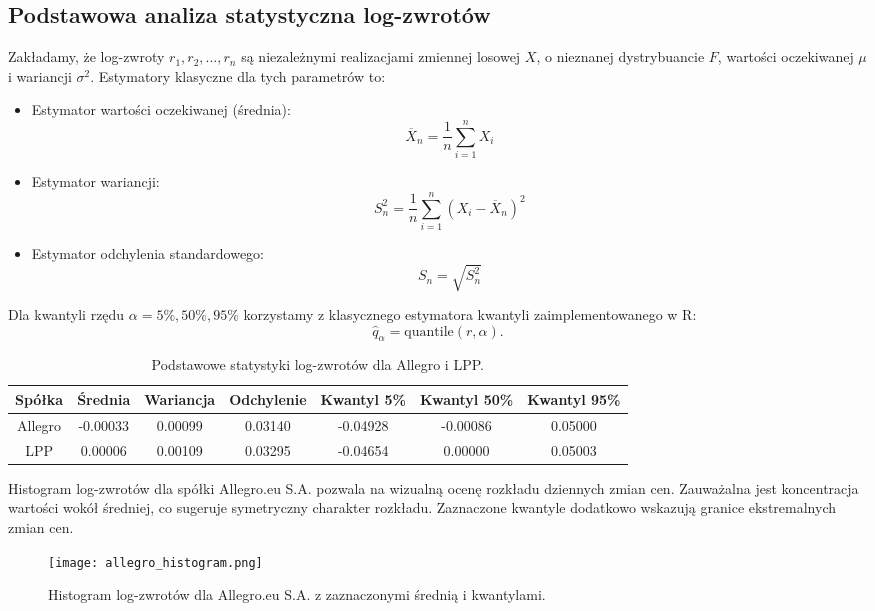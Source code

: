 \documentclass[12pt]{article}
\begin{document}
\subsection{Podstawowa analiza statystyczna log-zwrotów}

Zakładamy, że log-zwroty \( r_1, r_2, \ldots, r_n \) są niezależnymi realizacjami zmiennej losowej \( X \), o nieznanej dystrybuancie \( F \), wartości oczekiwanej \( \mu \) i wariancji \( \sigma^2 \). Estymatory klasyczne dla tych parametrów to:
\begin{itemize}
    \item Estymator wartości oczekiwanej (średnia):
    \[
    \overline{X}_n = \frac{1}{n} \sum_{i=1}^n X_i
    \]
    \item Estymator wariancji:
    \[
    S_n^2 = \frac{1}{n} \sum_{i=1}^n (X_i - \overline{X}_n)^2
    \]
    \item Estymator odchylenia standardowego:
    \[
    S_n = \sqrt{S_n^2}
    \]
\end{itemize}


Dla kwantyli rzędu \( \alpha = 5\%, 50\%, 95\% \) korzystamy z klasycznego estymatora kwantyli zaimplementowanego w R:
\[
\hat{q}_\alpha = \text{quantile}(r, \alpha).
\]

\begin{table}[H]
    \centering
    \begin{tabular}{|c|c|c|c|c|c|c|}
        \hline
        Spółka & Średnia & Wariancja & Odchylenie & Kwantyl 5\% & Kwantyl 50\% & Kwantyl 95\% \\ \hline
        Allegro & -0.00033 & 0.00099 & 0.03140 & -0.04928 & -0.00086 & 0.05000 \\ \hline
        LPP     & 0.00006  & 0.00109 & 0.03295 & -0.04654 & 0.00000  & 0.05003 \\ \hline
    \end{tabular}
    \caption{Podstawowe statystyki log-zwrotów dla Allegro i LPP.}
    \label{tab:log_returns_stats}
\end{table}

Histogram log-zwrotów dla spółki Allegro.eu S.A. pozwala na wizualną ocenę rozkładu dziennych zmian cen. Zauważalna jest koncentracja wartości wokół średniej, co sugeruje symetryczny charakter rozkładu. Zaznaczone kwantyle dodatkowo wskazują granice ekstremalnych zmian cen.

\begin{figure}[H]
    \centering
    \texttt{[image: allegro\_histogram.png]}
    \caption{Histogram log-zwrotów dla Allegro.eu S.A. z zaznaczonymi średnią i kwantylami.}
    \label{fig:allegro_histogram}
\end{figure}
\end{document}
